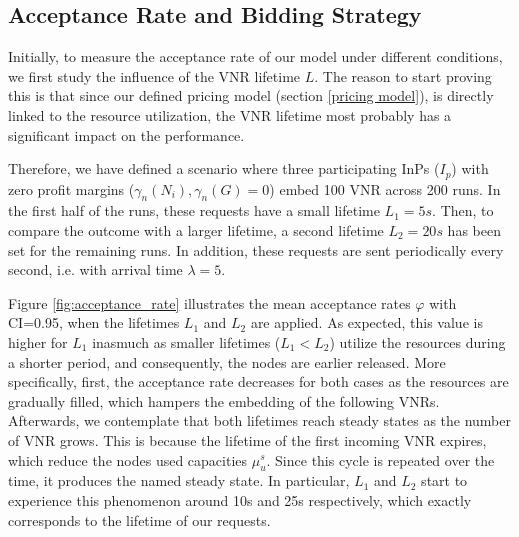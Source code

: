\subsection{Acceptance Rate and Bidding Strategy}

Initially, to measure the acceptance rate of our model under different conditions, we first study the influence of the VNR lifetime $L$. The reason to start proving this is that since our defined pricing model (section \ref{pricing model}), is directly linked to the resource utilization, the VNR lifetime most probably has a significant impact on the performance.

Therefore, we have defined a scenario where three participating InPs ($I_p$) with zero profit margins ($\gamma_n(N_i),\gamma_n(G) = 0$) embed 100 VNR across 200 runs. In the first half of the runs, these requests have a small lifetime $L_1 = 5s$. Then, to compare the outcome with a larger lifetime, a second lifetime $L_2=20s$ has been set for the remaining runs. In addition, these requests are sent periodically every second, i.e. with arrival time $\lambda = 5$.

Figure \ref{fig:acceptance_rate} illustrates the mean acceptance rates $\varphi$ with CI=0.95, when the lifetimes $L_1$ and $L_2$ are applied. As expected, this value is higher for $L_1$ inasmuch as smaller lifetimes ($L_1 < L_2$) utilize the resources during a shorter period, and consequently, the nodes are earlier released. More specifically, first, the acceptance rate decreases for both cases as the resources are gradually filled, which hampers the embedding of the following VNRs. Afterwards, we contemplate that both lifetimes reach steady states as the number of VNR grows. This is because the lifetime of the first incoming VNR expires, which reduce the nodes used capacities $\mu^s_u$. Since this cycle is repeated over the time, it produces the named steady state. In particular, $L_1$ and $L_2$ start to experience this phenomenon around 10s and 25s respectively, which exactly corresponds to the lifetime of our requests.

